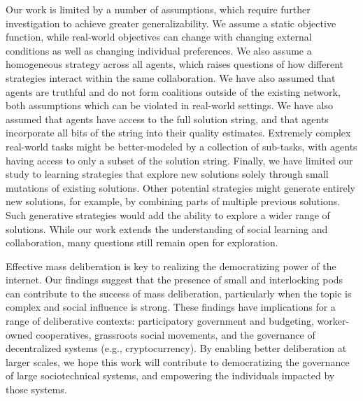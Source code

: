 Our work is limited by a number of assumptions, which require further investigation to achieve greater generalizability. We assume a static objective function, while real-world objectives can change with changing external conditions as well as changing individual preferences. We also assume a homogeneous strategy across all agents, which raises questions of how different strategies interact within the same collaboration. We have also assumed that agents are truthful and do not form coalitions outside of the existing network, both assumptions which can be violated in real-world settings.
We have also assumed that agents have access to the full solution string, and that agents incorporate all bits of the string into their quality estimates. Extremely complex real-world tasks might be better-modeled by a collection of sub-tasks, with agents having access to only a subset of the solution string.
Finally, we have limited our study to learning strategies that explore new solutions solely through small mutations of existing solutions. Other potential strategies might generate entirely new solutions, for example, by combining parts of multiple previous solutions. Such generative strategies would add the ability to explore a wider range of solutions. While our work extends the understanding of social learning and collaboration, many questions still remain open for exploration.

Effective mass deliberation is key to realizing the democratizing power of the internet. Our findings suggest that the presence of small and interlocking pods can contribute to the success of mass deliberation, particularly when the topic is complex and social influence is strong. These findings have implications for a range of deliberative contexts: participatory government and budgeting, worker-owned cooperatives, grassroots social movements, and the governance of decentralized systems (e.g., cryptocurrency). By enabling better deliberation at larger scales, we hope this work will contribute to democratizing the governance of large sociotechnical systems, and empowering the individuals impacted by those systems.

